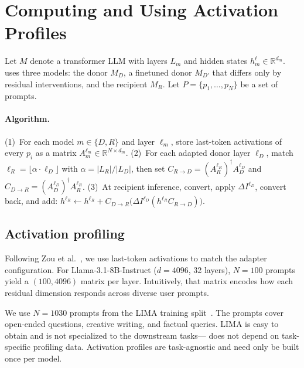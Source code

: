 
\section{Computing and Using Activation Profiles}
\label{sec-method}
Let $M$ denote a transformer LLM with layers $L_m$ and hidden states $h_m^{\ell}\in\mathbb{R}^{d_m}$.
\cmdv{} uses three models: the donor $M_D$, a finetuned donor $M_{D'}$ that differs only by residual interventions, and the recipient $M_R$.
Let $P=\{p_1,\ldots,p_N\}$ be a set of prompts.

\paragraph{Algorithm.}
(1)~For each model $m\in\{D,R\}$ and layer $\ell_m$, store last-token activations of every $p_i$ as a matrix $A_m^{\ell_m}\in\mathbb{R}^{N\times d_m}$.
(2)~For each adapted donor layer $\ell_D$, match $\ell_R=\lfloor\alpha\cdot \ell_D\rfloor$ with $\alpha=|L_R|/|L_D|$, then set
$C_{R\to D}=(A_R^{\ell_R})^{\dagger}A_D^{\ell_D}$ and $C_{D\to R}=(A_D^{\ell_D})^{\dagger}A_R^{\ell_R}$.
(3)~At recipient inference, convert, apply $\Delta I^{\ell_D}$, convert back, and add:
$h^{\ell_R}\leftarrow h^{\ell_R}+C_{D\to R}\bigl(\Delta I^{\ell_D}(h^{\ell_R}C_{R\to D})\bigr)$.

\subsection{Activation profiling}

Following Zou et al.~\cite{zou2023repre}, we use last-token activations to match the adapter configuration.
For Llama-3.1-8B-Instruct ($d=4096$, 32 layers), $N=100$ prompts yield a $(100,4096)$ matrix per layer.
Intuitively, that matrix encodes how each residual dimension responds across diverse user prompts.


We use $N=1030$ prompts from the LIMA training split~\cite{zhou2023lima}.
The prompts cover open-ended questions, creative writing, and factual queries.
LIMA is easy to obtain and is not specialized to the downstream tasks---\cmdv{} does not depend on task-specific profiling data.
Activation profiles are task-agnostic and need only be built once per model.

